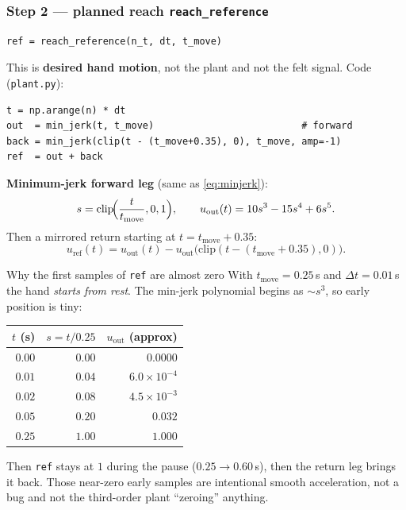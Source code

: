 \documentclass[11pt,a4paper]{article}
\newcommand{\dt}{\Delta t}
\begin{document}
\subsubsection{Step 2 --- planned reach \texttt{reach\_reference}}

\begin{verbatim}
ref = reach_reference(n_t, dt, t_move)
\end{verbatim}

This is \textbf{desired hand motion}, not the plant and not the felt signal.
Code (\texttt{plant.py}):

\begin{verbatim}
t = np.arange(n) * dt
out  = min_jerk(t, t_move)                          # forward
back = min_jerk(clip(t - (t_move+0.35), 0), t_move, amp=-1)
ref  = out + back
\end{verbatim}

\textbf{Minimum-jerk forward leg} (same as \eqref{eq:minjerk}):
\begin{equation}
s = \mathrm{clip}\!\Bigl(\frac{t}{t_{\mathrm{move}}},0,1\Bigr),\qquad
u_{\mathrm{out}}(t) = 10s^3 - 15s^4 + 6s^5.
\label{eq:l4minjerk}
\end{equation}
Then a mirrored return starting at $t=t_{\mathrm{move}}+0.35$:
\begin{equation}
u_{\mathrm{ref}}(t) = u_{\mathrm{out}}(t)
  - u_{\mathrm{out}}\bigl(\mathrm{clip}(t-(t_{\mathrm{move}}+0.35),0)\bigr).
\label{eq:l4ref}
\end{equation}

\begin{examplebox}{Why the first samples of \texttt{ref} are almost zero}
With $t_{\mathrm{move}}=0.25$\,s and $\dt=0.01$\,s the hand \emph{starts from
rest}.  The min-jerk polynomial begins as $\sim s^3$, so early position is tiny:

\begin{center}
\small
\begin{tabular}{@{}rrr@{}}
\toprule
$t$ (s) & $s=t/0.25$ & $u_{\mathrm{out}}$ (approx) \\
\midrule
$0.00$ & $0.00$ & $0.0000$ \\
$0.01$ & $0.04$ & $6.0\times10^{-4}$ \\
$0.02$ & $0.08$ & $4.5\times10^{-3}$ \\
$0.05$ & $0.20$ & $0.032$ \\
$0.25$ & $1.00$ & $1.000$ \\
\bottomrule
\end{tabular}
\end{center}

Then \texttt{ref} stays at $1$ during the pause ($0.25\to0.60$\,s), then the
return leg brings it back.  Those near-zero early samples are intentional
smooth acceleration, not a bug and not the third-order plant ``zeroing''
anything.
\end{examplebox}
\end{document}
